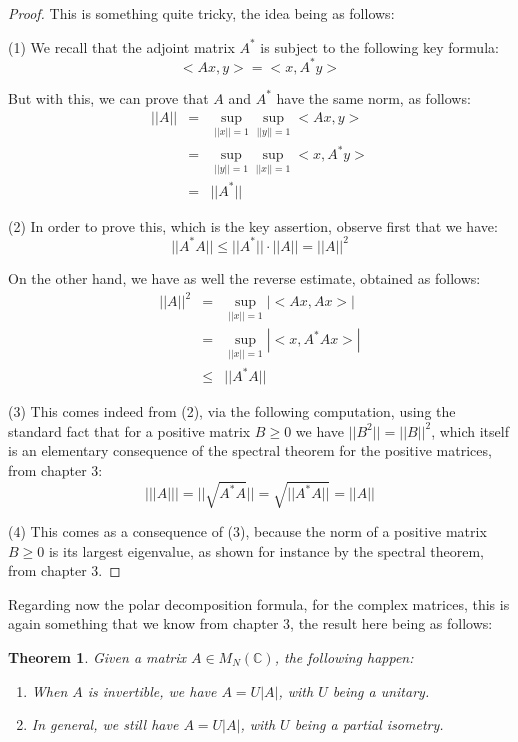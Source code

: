 \documentclass[12pt]{amsbook}
\newtheorem{theorem}{Theorem}[chapter]
\begin{document}
\begin{proof}
This is something quite tricky, the idea being as follows:

\medskip

(1) We recall that the adjoint matrix $A^*$ is subject to the following key formula:
$$<Ax,y>=<x,A^*y>$$

But with this, we can prove that $A$ and $A^*$ have the same norm, as follows:
\begin{eqnarray*}
||A||
&=&\sup_{||x||=1}\sup_{||y||=1}<Ax,y>\\
&=&\sup_{||y||=1}\sup_{||x||=1}<x,A^*y>\\
&=&||A^*||
\end{eqnarray*}

(2) In order to prove this, which is the key assertion, observe first that we have:
$$||A^*A||
\leq||A^*||\cdot||A||
=||A||^2$$

On the other hand, we have as well the reverse estimate, obtained as follows:
\begin{eqnarray*}
||A||^2
&=&\sup_{||x||=1}|<Ax,Ax>|\\
&=&\sup_{||x||=1}|<x,A^*Ax>|\\
&\leq&||A^*A||
\end{eqnarray*}

(3) This comes indeed from (2), via the following computation, using the standard fact that for a positive matrix $B\geq0$ we have $||B^2||=||B||^2$, which itself is an elementary consequence of the spectral theorem for the positive matrices, from chapter 3:
$$\Big|\Big||A|\Big|\Big|=||\sqrt{A^*A}||=\sqrt{||A^*A||}=||A||$$

(4) This comes as a consequence of (3), because the norm of a positive matrix $B\geq0$ is its largest eigenvalue, as shown for instance by the spectral theorem, from chapter 3.
\end{proof}

Regarding now the polar decomposition formula, for the complex matrices, this is again something that we know from chapter 3, the result here being as follows:


\begin{theorem}
Given a matrix $A\in M_N(\mathbb C)$, the following happen:
\begin{enumerate}
\item When $A$ is invertible, we have $A=U|A|$, with $U$ being a unitary.

\item In general, we still have $A=U|A|$, with $U$ being a partial isometry.
\end{enumerate}
\end{theorem}
\end{document}
